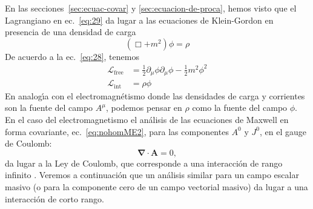 En las secciones~\ref{sec:ecuac-covar} y \ref{sec:ecuacion-de-proca},
hemos visto que el Lagrangiano en ec.~\eqref{eq:29} da lugar a las
ecuaciones de Klein-Gordon en presencia de una densidad de carga
\begin{equation}
  \label{eq:30}
  (\Box+m^2)\phi=\rho
\end{equation}
De acuerdo a la ec.~\eqref{eq:28}, tenemos
\begin{align}
\mathcal{L}_{\text{free}}&=\frac{1}{2}\partial_\mu\phi\partial_\mu\phi-\frac{1}{2} m^2\phi^2\nonumber\\
\label{eq:31}
\mathcal{L}_{\text{int}}&=\rho\phi
\end{align}
En analog\'\i a con el electromagn\'etismo donde las densidades de carga y
corrientes son la fuente del campo $A^\mu$, podemos pensar en $\rho$ como
la fuente del campo $\phi$. En el caso del electromagnetismo el an\'alisis
de las ecuaciones de Maxwell en forma covariante,
ec.~\eqref{eq:nohomME2}, para las componentes $A^0$ y $J^0$, en el
gauge de Coulomb:
\begin{equation}
  \label{eq:32}
  \boldsymbol{\nabla}\cdot\mathbf{A}=0,
\end{equation}
da lugar a la Ley de Coulomb, que corresponde a una interacci\'on de
rango infinito \cite{Gross}. Veremos a continuaci\'on que un an\'alisis
similar para un campo escalar masivo (o para la componente cero de un
campo vectorial masivo) da lugar a una interacci\'on de corto rango.


